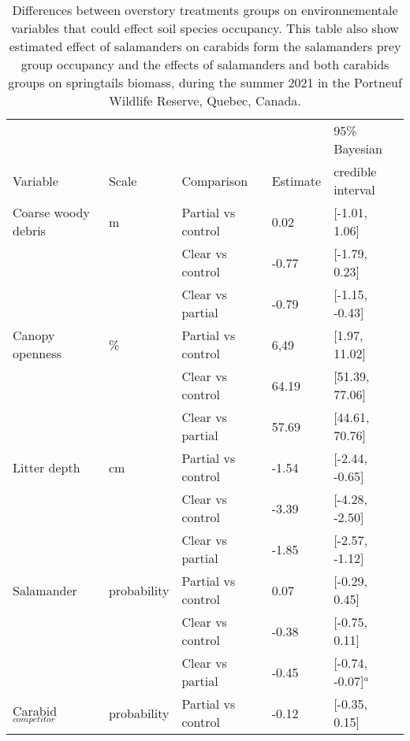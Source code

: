 \begin{table}[ht]
  \centering
  \caption[Differences between overstory treatments groups on environnementale variables and group species occupancy.]
  {Differences between overstory treatments groups on environnementale variables that could effect soil species occupancy. 
  This table also show estimated effect of salamanders on carabids form the salamanders prey group occupancy 
  and the effects of salamanders and both carabids groups on springtails biomass, during the summer 2021 in the Portneuf Wildlife Reserve,
  Quebec, Canada.}
  \label{tab:overstory}
  \begin{tabular}{lllll} 
      \hline
      &&&&95\% Bayesian \\
      Variable&Scale& Comparison & Estimate &  credible interval \\ [0.5ex] 
      \hline
      Coarse woody debris &m\up{3}& Partial vs control & \hspace{1mm}0.02 & [-1.01, 1.06] \\ 
                 && Clear vs control  & -0.77 & [-1.79, 0.23] \\ 
                          && Clear vs partial  & -0.79 & [-1.15, -0.43] \\
      Canopy openness     &\%& Partial vs control & \hspace{1mm}6,49 & [1.97, 11.02] \\ 
                      && Clear vs control  & \hspace{1mm}64.19 & [51.39, 77.06] \\ 
                          && Clear vs partial  & \hspace{1mm}57.69 & [44.61, 70.76] \\ 
      Litter depth        &cm& Partial vs control & -1.54 & [-2.44, -0.65] \\ 
                      && Clear vs control  & -3.39 & [-4.28, -2.50] \\ 
                          && Clear vs partial  & -1.85 & [-2.57, -1.12] \\       
      Salamander          &probability& Partial vs control & \hspace{1mm}0.07 & [-0.29, 0.45] \\ 
             && Clear vs control  & -0.38 & [-0.75, 0.11] \\ 
                          && Clear vs partial  & -0.45 & [-0.74, -0.07]$^{a}$ \\       
      Carabid$_{competitor}$ &probability& Partial vs control & -0.12 & [-0.35, 0.15] \\

\end{tabular}
\end{table}
